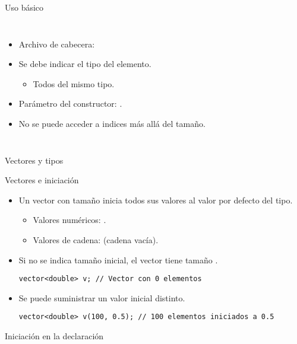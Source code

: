 \begin{frame}{Uso básico}
\begin{columns}[t]



\begin{itemize}
  \item Archivo de cabecera:
  \item Se debe indicar el tipo del elemento.
    \begin{itemize}
      \item Todos del mismo tipo.
    \end{itemize}
  \item Parámetro del constructor:
      .
  \item No se puede acceder a indices más allá del tamaño.
\end{itemize}
\end{columns}
\end{frame}

\begin{frame}{Vectores y tipos}

\end{frame}


\begin{frame}[t,fragile]{Vectores e iniciación}
\begin{itemize}
  \item Un vector con tamaño inicia todos sus valores al valor por defecto del tipo.
    \begin{itemize}
      \item Valores numéricos: .
      \item Valores de cadena:  (cadena vacía).
    \end{itemize}
  \item Si no se indica tamaño inicial, el vector tiene tamaño .
\begin{lstlisting}
vector<double> v; // Vector con 0 elementos
\end{lstlisting}
  \item Se puede suministrar un valor inicial distinto.
\begin{lstlisting}
vector<double> v(100, 0.5); // 100 elementos iniciados a 0.5
\end{lstlisting}
\end{itemize}
\end{frame}

\begin{frame}{Iniciación en la declaración}

\end{frame}


